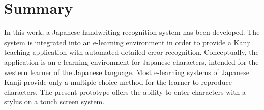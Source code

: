 
\chapter*{Summary}
\label{chap:summary}
\pagestyle{empty}


  



    



In this work, a Japanese handwriting recognition system has been developed.
The system is integrated into an e-learning environment 
in order to provide a Kanji teaching application with automated 
detailed error recognition.
Conceptually, the application is an e-learning environment for Japanese 
characters, intended for the western learner of the Japanese language. 
Most e-learning systems of Japanese Kanji provide only a multiple choice method
for the learner to reproduce characters. The present prototype offers the
ability to enter characters with a stylus on a touch screen system.

